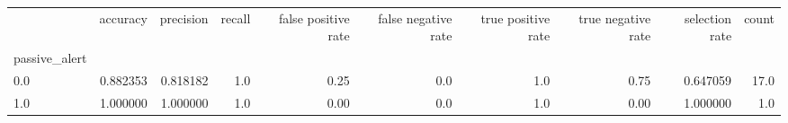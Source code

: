 \begin{tabular}{lrrrrrrrrr}
\toprule
{} &  accuracy &  precision &  recall &  false positive rate &  false negative rate &  true positive rate &  true negative rate &  selection rate &  count \\
passive\_alert &           &            &         &                      &                      &                     &                     &                 &        \\
\midrule
0.0           &  0.882353 &   0.818182 &     1.0 &                 0.25 &                  0.0 &                 1.0 &                0.75 &        0.647059 &   17.0 \\
1.0           &  1.000000 &   1.000000 &     1.0 &                 0.00 &                  0.0 &                 1.0 &                0.00 &        1.000000 &    1.0 \\
\bottomrule
\end{tabular}
